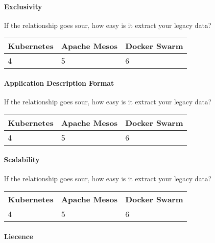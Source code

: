 \paragraph{Exclusivity}

If the relationship goes sour, how easy is it extract your legacy data?

\begin{center}
  \begin{tabular}{ | p{4.5cm} | p{4.5cm} | p{4.5cm} | }
    \hline
    \textbf{Kubernetes}&\textbf{Apache Mesos}&\textbf{Docker Swarm}\\\hline
    4 & 5 & 6 \\
    \hline
  \end{tabular}
\end{center}

\paragraph{Application Description Format}

If the relationship goes sour, how easy is it extract your legacy data?

\begin{center}
  \begin{tabular}{ | p{4.5cm} | p{4.5cm} | p{4.5cm} | }
    \hline
    \textbf{Kubernetes}&\textbf{Apache Mesos}&\textbf{Docker Swarm}\\\hline
    4 & 5 & 6 \\
    \hline
  \end{tabular}
\end{center}

\paragraph{Scalability}

If the relationship goes sour, how easy is it extract your legacy data?

\begin{center}
  \begin{tabular}{ | p{4.5cm} | p{4.5cm} | p{4.5cm} | }
    \hline
    \textbf{Kubernetes}&\textbf{Apache Mesos}&\textbf{Docker Swarm}\\\hline
    4 & 5 & 6 \\
    \hline
  \end{tabular}
\end{center}

\paragraph{Liecence}

